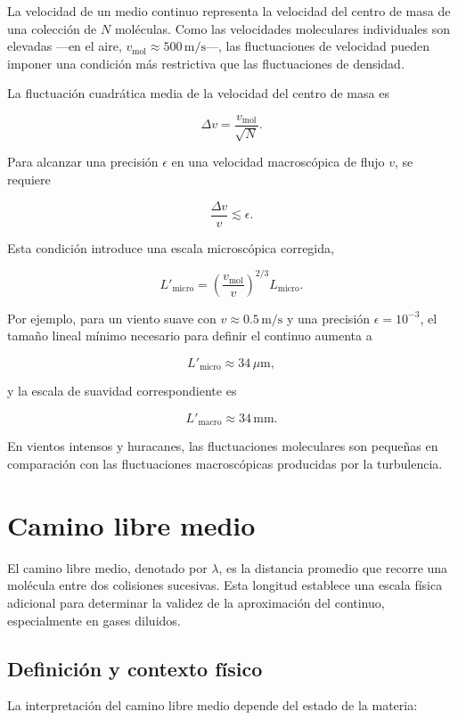 La velocidad de un medio continuo representa la velocidad del centro de masa
de una colección de $N$ moléculas. Como las velocidades moleculares
individuales son elevadas ---en el aire,
$v_{\mathrm{mol}}\approx500\,\mathrm{m/s}$---, las fluctuaciones de velocidad
pueden imponer una condición más restrictiva que las fluctuaciones de
densidad.

La fluctuación cuadrática media de la velocidad del centro de masa es

$$
\Delta v=\frac{v_{\mathrm{mol}}}{\sqrt{N}}.
$$

\figuraFluctuacionesVelocidad

Para alcanzar una precisión $\epsilon$ en una velocidad macroscópica de flujo
$v$, se requiere

$$
\frac{\Delta v}{v}\lesssim\epsilon.
$$

Esta condición introduce una escala microscópica corregida,

$$
L'_{\mathrm{micro}}
=\left(\frac{v_{\mathrm{mol}}}{v}\right)^{2/3}
L_{\mathrm{micro}}.
$$

Por ejemplo, para un viento suave con $v\approx0.5\,\mathrm{m/s}$ y una
precisión $\epsilon=10^{-3}$, el tamaño lineal mínimo necesario para definir
el continuo aumenta a

$$
L'_{\mathrm{micro}}\approx34\,\mu\mathrm{m},
$$

y la escala de suavidad correspondiente es

$$
L'_{\mathrm{macro}}\approx34\,\mathrm{mm}.
$$

En vientos intensos y huracanes, las fluctuaciones moleculares son pequeñas en
comparación con las fluctuaciones macroscópicas producidas por la turbulencia.

\section{Camino libre medio}

El camino libre medio, denotado por $\lambda$, es la distancia promedio que
recorre una molécula entre dos colisiones sucesivas. Esta longitud establece
una escala física adicional para determinar la validez de la aproximación del
continuo, especialmente en gases diluidos.

\subsection{Definición y contexto físico}

La interpretación del camino libre medio depende del estado de la materia:


